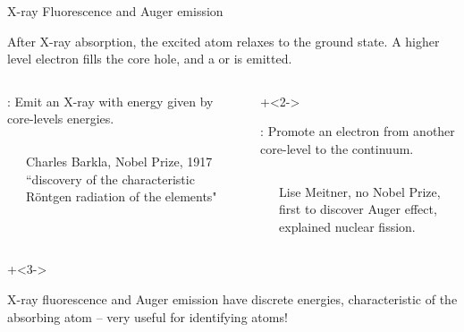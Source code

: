 \begin{slide} {X-ray Fluorescence and Auger emission}

\begin{cenpage}{110mm}
  After X-ray absorption, the excited atom relaxes to the
  ground state.  A higher level electron fills the core hole, and a
  {} or {} is emitted.
\end{cenpage}

\vmm

  \begin{columns}[T]
      \begin{column}{55mm}
        {}:
        Emit an X-ray with energy given by core-levels energies.

       \hspace{4mm} 

        \begin{columns}
          \begin{column}{8mm}
          \end{column}
          \begin{column}{40mm}

            {\tiny{Charles Barkla, Nobel Prize, 1917 ``discovery of the characteristic R\"ontgen radiation of the elements"
                }}
          \end{column}
        \end{columns}

      \end{column}
      \begin{column}{55mm}
        \onslide+<2->

        {}:
        Promote an electron from another core-level to the continuum.

       \hspace{4mm} 

        \begin{columns}
          \begin{column}{8mm}
          \end{column}
          \begin{column}{40mm}

            {\tiny{Lise Meitner, no Nobel Prize,  first to discover Auger effect, explained nuclear fission}}.

          \end{column}
        \end{columns}

      \end{column}
    \end{columns}

    \onslide+<3->

    \begin{postitbox}{105mm}
        X-ray fluorescence and Auger emission have discrete energies,
        characteristic of the absorbing atom -- very useful for identifying atoms!
      \end{postitbox}

\vfill
\end{slide}

